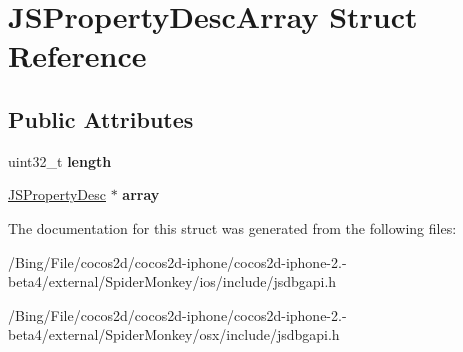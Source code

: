 \hypertarget{struct_j_s_property_desc_array}{\section{J\-S\-Property\-Desc\-Array Struct Reference}
\label{struct_j_s_property_desc_array}
}
\subsection*{Public Attributes}
\begin{DoxyCompactItemize}
\item 
\hypertarget{struct_j_s_property_desc_array_a6d8168a0b984849806ad05d6a30ae615}{uint32\-\_\-t {\bfseries length}}\label{struct_j_s_property_desc_array_a6d8168a0b984849806ad05d6a30ae615}

\item 
\hypertarget{struct_j_s_property_desc_array_a9f90ebd977a7e0b1f34a1f83d7959a55}{\hyperlink{struct_j_s_property_desc}{J\-S\-Property\-Desc} $\ast$ {\bfseries array}}\label{struct_j_s_property_desc_array_a9f90ebd977a7e0b1f34a1f83d7959a55}

\end{DoxyCompactItemize}


The documentation for this struct was generated from the following files\-:\begin{DoxyCompactItemize}
\item 
/\-Bing/\-File/cocos2d/cocos2d-\/iphone/cocos2d-\/iphone-\/2.-\/beta4/external/\-Spider\-Monkey/ios/include/jsdbgapi.\-h\item 
/\-Bing/\-File/cocos2d/cocos2d-\/iphone/cocos2d-\/iphone-\/2.-\/beta4/external/\-Spider\-Monkey/osx/include/jsdbgapi.\-h\end{DoxyCompactItemize}
